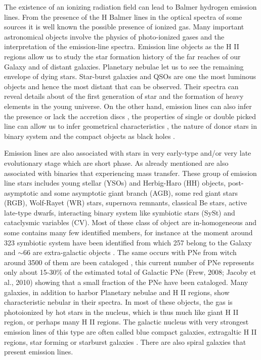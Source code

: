 \documentclass[fleqn,usenatbib]{mnras}
\begin{document}
The existence of an ionizing radiation field can lead to Balmer hydrogen
emission lines. From the presence  of the H Balmer lines in the optical
spectra of some sources it is well known the possible presence of ionized
gas. Many important astronomical objects involve the physics of photo-ionized
gases and the interpretation of the emission-line spectra. Emission line
objects as the H II regions allow us to study the star formation history
of the far reaches of our Galaxy and of distant galaxies. Planetary nebulae
let us to see the remaining envelope of dying stars. Star-burst galaxies and
QSOs are one the most luminous objects and hence the most distant that can
be observed. Their spectra can reveal details about of the first generation
of star and the formation of heavy elements in the young universe. On the
other hand, emission lines can also infer the presence or lack the accretion
discs \citep{Schwope:2000, Ratti:2012}, the properties of single or double
picked line can allow us to infer geometrical characteristics \citep{Horne:1986},
the nature of  donor stars in binary system \citep{Steeghs:2002, Spaandonk:2010, Casares:2015}
and the compact objects as black holes \citep{Casares:2016}. 

Emission lines are also associated with stars in very early-type and/or
very late evolutionary stage which are short phase. As already mentioned
are also associated with binaries that experiencing mass transfer. These
group of emission line stars includes young stellar (YSOs) and Herbig-Haro
(HH) objects, post-asymptotic and some asymptotic giant branch (AGB), some
red giant stars (RGB), Wolf-Rayet (WR) stars, supernova remnants, classical
Be stars, active late-type dwarfs, interacting binary system like symbiotic
stars (SySt) and cataclysmic variables (CV). Most of these class of object
are in-homogeneous and some contains many few identified members, for
instance at the moment around 323 symbiotic system have been identified
from which 257 belong to the Galaxy and  $\sim$66 are extra-galactic
objects \citep{Akras:2019a}. The same occurs with PNe from witch around
3500 of them are been cataloged \citep{Parker:2016}, this current number
of PNe represents only about 15-30\% of the estimated total of Galactic
PNe (Frew, 2008; Jacoby et al., 2010) showing that a small fraction of the
PNe have been cataloged. Many galaxies, in addition to harbor Planetary
nebulae and H II regions, show characteristic nebular in their spectra.
In most of these objects, the gas is photoionized by hot stars in the nucleus,
which is thus much like giant H II region, or perhaps many H II regions.
The galactic nucleus with very strongest  emission lines of this type are
often called blue compact galaxies, extragaltic H II regions, star forming
or starburst galaxies \citep{Osterbrock:2006}. There are also spiral galaxies
that present emission lines.
\end{document}
